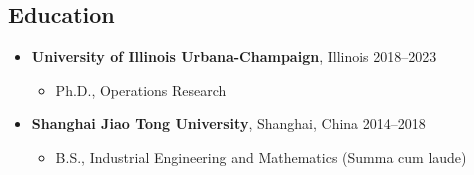 \documentclass[margin,line]{resume}
\begin{document}
\begin{resume}
 \section{\mysidestyle Education} 
    \begin{itemize}[topsep=-5mm, leftmargin=0mm]
        \item [] \textbf{University of Illinois Urbana-Champaign}, Illinois \hfill 2018--2023
         \begin{itemize}
             \item [] Ph.D., Operations Research
         \end{itemize}
        \item [] \textbf{Shanghai Jiao Tong University}, Shanghai, China \hfill 2014--2018
         \begin{itemize}
             \item [] B.S., Industrial Engineering and Mathematics (Summa cum laude)
         \end{itemize}
    \end{itemize}
         
         
         



\end{resume}
\end{document}
